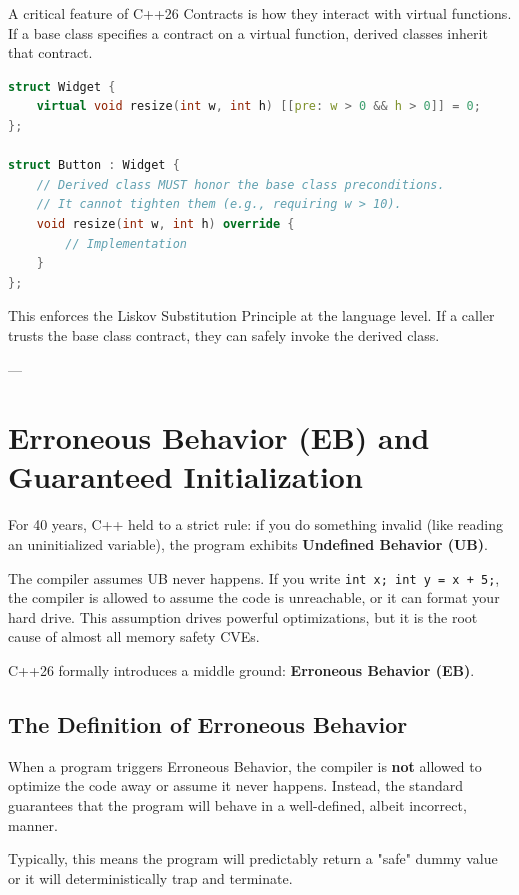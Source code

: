 A critical feature of C++26 Contracts is how they interact with virtual functions. If a base class specifies a contract on a virtual function, derived classes inherit that contract. 

\begin{lstlisting}[language=C++]
struct Widget {
    virtual void resize(int w, int h) [[pre: w > 0 && h > 0]] = 0;
};

struct Button : Widget {
    // Derived class MUST honor the base class preconditions.
    // It cannot tighten them (e.g., requiring w > 10).
    void resize(int w, int h) override {
        // Implementation
    }
};
\end{lstlisting}

This enforces the Liskov Substitution Principle at the language level. If a caller trusts the base class contract, they can safely invoke the derived class.

---

\section{Erroneous Behavior (EB) and Guaranteed Initialization}

For 40 years, C++ held to a strict rule: if you do something invalid (like reading an uninitialized variable), the program exhibits \textbf{Undefined Behavior (UB)}. 

The compiler assumes UB never happens. If you write \texttt{int x; int y = x + 5;}, the compiler is allowed to assume the code is unreachable, or it can format your hard drive. This assumption drives powerful optimizations, but it is the root cause of almost all memory safety CVEs.

C++26 formally introduces a middle ground: \textbf{Erroneous Behavior (EB)}.

\subsection{The Definition of Erroneous Behavior}

When a program triggers Erroneous Behavior, the compiler is \textbf{not} allowed to optimize the code away or assume it never happens. Instead, the standard guarantees that the program will behave in a well-defined, albeit incorrect, manner. 

Typically, this means the program will predictably return a "safe" dummy value or it will deterministically trap and terminate.

